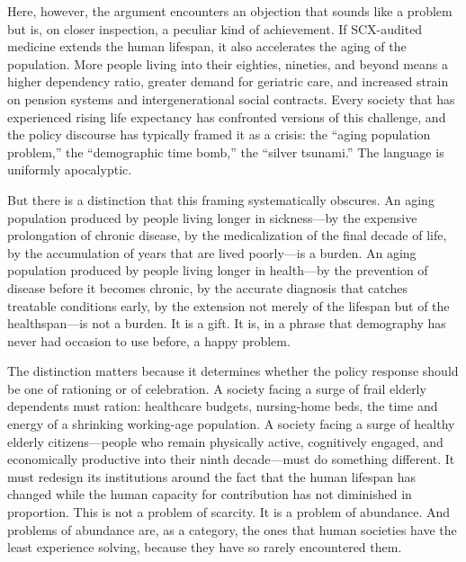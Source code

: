 \documentclass[12pt,a4paper]{article}
\begin{document}
Here, however, the argument encounters an objection that sounds like a problem but is, on closer inspection, a peculiar kind of achievement. If SCX-audited medicine extends the human lifespan, it also accelerates the aging of the population. More people living into their eighties, nineties, and beyond means a higher dependency ratio, greater demand for geriatric care, and increased strain on pension systems and intergenerational social contracts. Every society that has experienced rising life expectancy has confronted versions of this challenge, and the policy discourse has typically framed it as a crisis: the ``aging population problem,'' the ``demographic time bomb,'' the ``silver tsunami.'' The language is uniformly apocalyptic.

But there is a distinction that this framing systematically obscures. An aging population produced by people living longer in sickness---by the expensive prolongation of chronic disease, by the medicalization of the final decade of life, by the accumulation of years that are lived poorly---is a burden. An aging population produced by people living longer in health---by the prevention of disease before it becomes chronic, by the accurate diagnosis that catches treatable conditions early, by the extension not merely of the lifespan but of the healthspan---is not a burden. It is a gift. It is, in a phrase that demography has never had occasion to use before, a happy problem.

The distinction matters because it determines whether the policy response should be one of rationing or of celebration. A society facing a surge of frail elderly dependents must ration: healthcare budgets, nursing-home beds, the time and energy of a shrinking working-age population. A society facing a surge of healthy elderly citizens---people who remain physically active, cognitively engaged, and economically productive into their ninth decade---must do something different. It must redesign its institutions around the fact that the human lifespan has changed while the human capacity for contribution has not diminished in proportion. This is not a problem of scarcity. It is a problem of abundance. And problems of abundance are, as a category, the ones that human societies have the least experience solving, because they have so rarely encountered them.
\end{document}
